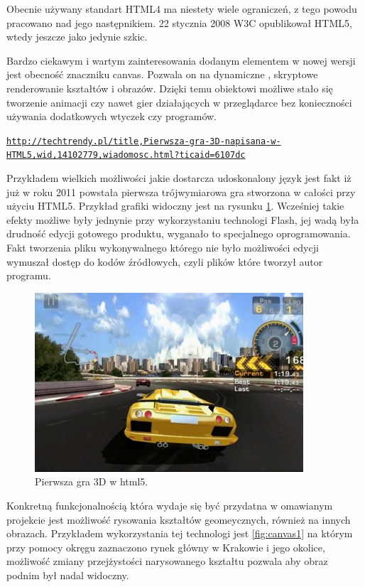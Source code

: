 Obecnie używany standart HTML4 ma niestety wiele ograniczeń, z tego powodu pracowano nad jego następnikiem. 22 stycznia 2008 W3C opublikował HTML5, wtedy jeszcze jako jedynie szkic.

Bardzo ciekawym i wartym zainteresowania dodanym elementem w nowej wersji jest obecność znaczniku canvas. Pozwala on na dynamiczne , skryptowe renderowanie kształtów i obrazów. Dzięki temu obiektowi możliwe stało się tworzenie animacji czy nawet gier działających w przeglądarce bez konieczności używania dodatkowych wtyczek czy programów.

\underline{\texttt{http://techtrendy.pl/title,Pierwsza-gra-3D-napisana-w-HTML5,wid,14102779,wiadomosc.html?ticaid=6107dc}}

Przykładem wielkich możliwości jakie dostarcza udoskonalony język jest fakt iż już w roku 2011 powstała pierwsza trójwymiarowa gra stworzona w całości przy użyciu HTML5. Przykład grafiki widoczny jest na rysunku \ref{fig:html3d}.
Wcześniej takie efekty możliwe były jednynie przy wykorzystaniu technologi Flash, jej wadą była drudność edycji gotowego produktu, wyganało to specjalnego oprogramowania. Fakt tworzenia pliku wykonywalnego którego nie było możliwości edycji wymuszał dostęp do kodów źródłowych, czyli plików które tworzył autor programu.

\begin{figure}[H]
  \centering
    \includegraphics[width=100mm]{ge/html5_3d.jpg}
  \caption{Pierwsza gra 3D w html5.}
  \label{fig:html3d}
\end{figure}

Konkretną funkcjonalnością która wydaje się być przydatna w omawianym projekcie jest możliwość rysowania kształtów geomeycznych, również na innych obrazach. Przykładem wykorzystania tej technologi jest \ref{fig:canvas1} na którym przy pomocy okręgu zaznaczono rynek główny w Krakowie i jego okolice, możliwość zmiany przejżystości narysowanego kształtu pozwala aby obraz podnim był nadal widoczny.

